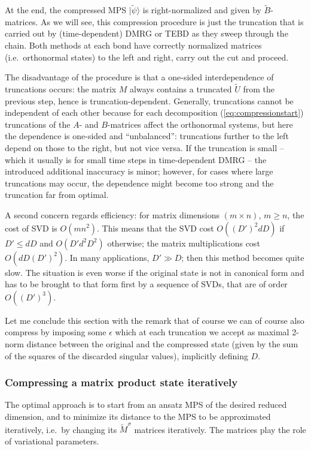 \documentclass[a4paper,10pt,oneside,onecolumn,1p,times]{elsarticle}
\newcommand{\ket}[1]{\mbox{$| #1  \rangle$}}
\begin{document}
At the end, the compressed MPS $\ket{\tilde{\psi}}$ is right-normalized and given by $\tilde{B}$-matrices. As we will see, this compression procedure is just the truncation that is carried out by (time-dependent) DMRG or TEBD as they sweep through the chain. Both methods at each bond have correctly normalized matrices (i.e.\ orthonormal states) to the left and right, carry out the cut and proceed.

The disadvantage of the procedure is that a one-sided interdependence of truncations occurs: the matrix $M$ always contains a truncated $\tilde{U}$ from the previous step, hence is truncation-dependent. Generally, truncations cannot be independent of each other because for each decomposition (\ref{eq:compressionstart}) truncations of the $A$- and $B$-matrices affect the orthonormal systems, but here the dependence is one-sided and ``unbalanced'': truncations further to the left depend on those to the right, but not vice versa. If the truncation is small -- which it usually is for small time steps in time-dependent DMRG -- the introduced additional inaccuracy is minor; however, for cases where large truncations may occur, the dependence might become too strong and the truncation far from optimal. 

A second concern regards efficiency: for matrix dimensions $(m\times n)$, $m\ge n$, the cost of SVD is $O(m n^2)$. This means that the SVD cost $O((D')^2 dD)$ if $D' \le dD$ and $O(D' d^2 D^2)$ otherwise; the matrix multiplications cost $O(dD(D')^2)$. In many applications, $D'\gg D$; then this method becomes quite slow. The situation is even worse if the original state is not in canonical form and has to be brought to that form first by a sequence of SVDs, that are of order $O((D')^3)$.

Let me conclude this section with the remark that of course we can of course also compress by imposing some $\epsilon$ which at each truncation we accept as maximal 2-norm distance between the original and the compressed state (given by the sum of the squares of the discarded singular values), implicitly defining $D$. 

\subsubsection{Compressing a matrix product state iteratively}
The optimal approach is to start from an ansatz MPS of the desired reduced dimension, and to minimize its distance to the MPS to be approximated iteratively, i.e.\ by changing its $\tilde{M}^\sigma$ matrices iteratively. The matrices play the role of variational parameters.
\end{document}
